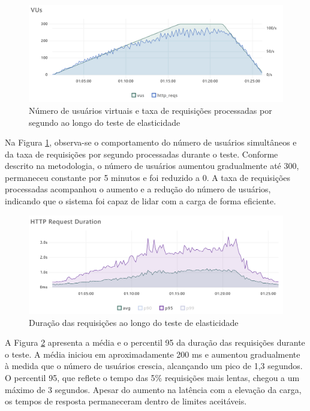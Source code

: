 \begin{figure}[H]
    \centering
    \includegraphics[width=1\textwidth]{assets/elasticity-test/vus-and-reqs.png}
    \caption{Número de usuários virtuais e taxa de requisições processadas por segundo ao longo do teste de elasticidade}
    \label{fig:elasticity-vus-and-reqs}
\end{figure}

Na Figura \ref{fig:elasticity-vus-and-reqs}, observa-se o comportamento do número de usuários simultâneos e da taxa de requisições por segundo processadas durante o teste. Conforme descrito na metodologia, o número de usuários aumentou gradualmente até 300, permaneceu constante por 5 minutos e foi reduzido a 0. A taxa de requisições processadas acompanhou o aumento e a redução do número de usuários, indicando que o sistema foi capaz de lidar com a carga de forma eficiente.

\begin{figure}[H]
    \centering
    \includegraphics[width=1\textwidth]{assets/elasticity-test/req-duration.png}
    \caption{Duração das requisições ao longo do teste de elasticidade}
    \label{fig:elasticity-req-duration}
\end{figure}

A Figura \ref{fig:elasticity-req-duration} apresenta a média e o percentil 95 da duração das requisições durante o teste. A média iniciou em aproximadamente 200 ms e aumentou gradualmente à medida que o número de usuários crescia, alcançando um pico de 1,3 segundos. O percentil 95, que reflete o tempo das 5\% requisições mais lentas, chegou a um máximo de 3 segundos. Apesar do aumento na latência com a elevação da carga, os tempos de resposta permaneceram dentro de limites aceitáveis.

